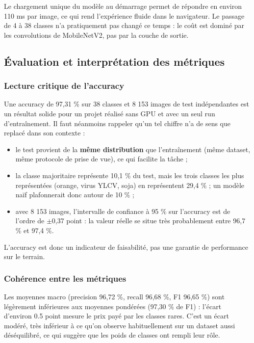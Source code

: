 \documentclass[10pt,a4paper]{article}
\begin{document}
Le chargement unique du modèle au démarrage permet de répondre en environ 110 ms par image, ce qui rend l'expérience fluide dans le navigateur. Le passage de 4 à 38 classes n'a pratiquement pas changé ce temps : le coût est dominé par les convolutions de MobileNetV2, pas par la couche de sortie.

\subsection{Évaluation et interprétation des métriques}

\subsubsection{Lecture critique de l'accuracy}

Une accuracy de 97,31 \% sur 38 classes et 8 153 images de test indépendantes est un résultat solide pour un projet réalisé sans GPU et avec un seul run d'entraînement. Il faut néanmoins rappeler qu'un tel chiffre n'a de sens que replacé dans son contexte :

\begin{itemize}
\item le test provient de la \textbf{même distribution} que l'entraînement (même dataset, même protocole de prise de vue), ce qui facilite la tâche ;
\item la classe majoritaire représente 10,1 \% du test, mais les trois classes les plus représentées (orange, virus YLCV, soja) en représentent 29,4 \% ; un modèle naïf plafonnerait donc autour de 10 \% ;
\item avec 8 153 images, l'intervalle de confiance à 95 \% sur l'accuracy est de l'ordre de $\pm$0,37 point : la valeur réelle se situe très probablement entre 96,7 \% et 97,4 \%.
\end{itemize}

L'accuracy est donc un indicateur de faisabilité, pas une garantie de performance sur le terrain.

\subsubsection{Cohérence entre les métriques}

Les moyennes macro (precision 96,72 \%, recall 96,68 \%, F1 96,65 \%) sont légèrement inférieures aux moyennes pondérées (97,30 \% de F1) : l'écart d'environ 0.5 point mesure le prix payé par les classes rares. C'est un écart modéré, très inférieur à ce qu'on observe habituellement sur un dataset aussi déséquilibré, ce qui suggère que les poids de classes ont rempli leur rôle.
\end{document}
